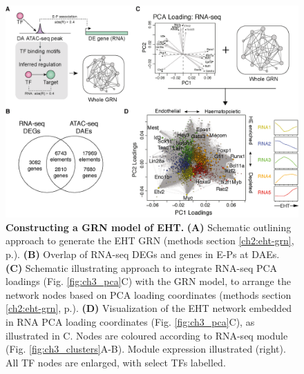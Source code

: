 \begin{figure}[t]
    \centering
    \includegraphics[width=\textwidth,height=\textheight,keepaspectratio]{figures/chapter3/ch3_eht-grn.png}
    \caption[{Constructing a GRN model of EHT.}]
    {\textbf{Constructing a GRN model of EHT.} 
    \textbf{(A)} Schematic outlining approach to generate the EHT GRN (methods section \ref{ch2:eht-grn}, p.\pageref{ch2:eht-grn}). 
    \textbf{(B)} Overlap of RNA-seq DEGs and genes in E-Ps at DAEs. 
    \textbf{(C)} Schematic illustrating approach to integrate RNA-seq PCA loadings (Fig. \ref{fig:ch3_pca}C) with the GRN model, to arrange the network nodes based on PCA loading coordinates (methods section \ref{ch2:eht-grn}, p.\pageref{ch2:eht-grn}). 
    \textbf{(D)} Visualization of the EHT network embedded in RNA PCA loading coordinates (Fig. \ref{fig:ch3_pca}C), as illustrated in C. Nodes are coloured according to RNA-seq module (Fig. \ref{fig:ch3_clusters}A-B). Module expression illustrated (right). All TF nodes are enlarged, with select TFs labelled.
    }
    \label{fig:ch3_eht-grn}
\end{figure}

